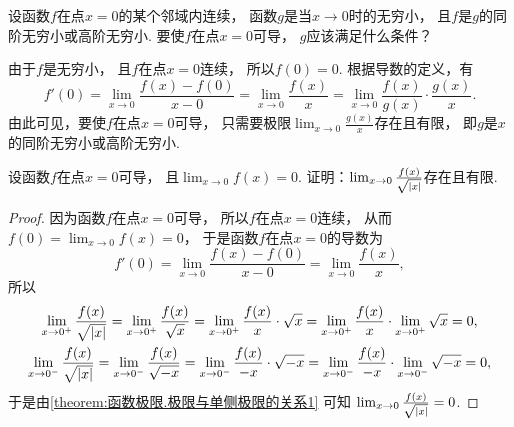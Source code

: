 \begin{example}
设函数\(f\)在点\(x=0\)的某个邻域内连续，
函数\(g\)是当\(x\to0\)时的无穷小，
且\(f\)是\(g\)的同阶无穷小或高阶无穷小.
要使\(f\)在点\(x=0\)可导，
\(g\)应该满足什么条件？
\begin{solution}
由于\(f\)是无穷小，
且\(f\)在点\(x=0\)连续，
所以\(f(0) = 0\).
根据导数的定义，有\[
	f'(0)
	= \lim_{x\to0} \frac{f(x) - f(0)}{x-0} %
	= \lim_{x\to0} \frac{f(x)}{x} %
	= \lim_{x\to0} \frac{f(x)}{g(x)} \cdot \frac{g(x)}{x}. %
\]
由此可见，要使\(f\)在点\(x=0\)可导，
只需要极限\(\lim_{x\to0} \frac{g(x)}{x}\)存在且有限，
即\(g\)是\(x\)的同阶无穷小或高阶无穷小.
\end{solution}
\end{example}
\begin{example}
设函数\(f\)在点\(x=0\)可导，
且\(\lim_{x\to0} f(x) = 0\).
证明：\(\lim_{x\to0} \frac{f(x)}{\sqrt{\abs{x}}}\)存在且有限.
\begin{proof}
因为函数\(f\)在点\(x=0\)可导，
所以\(f\)在点\(x=0\)连续，
从而\(f(0) = \lim_{x\to0} f(x) = 0\)，
于是函数\(f\)在点\(x=0\)的导数为\begin{equation*}
	f'(0)
	= \lim_{x\to0} \frac{f(x) - f(0)}{x - 0}
	= \lim_{x\to0} \frac{f(x)}{x},
\end{equation*}
所以\begin{gather*}
	\lim_{x\to0^+} \frac{f(x)}{\sqrt{\abs{x}}}
	= \lim_{x\to0^+} \frac{f(x)}{\sqrt{x}}
	= \lim_{x\to0^+} \frac{f(x)}{x} \cdot \sqrt{x}
	= \lim_{x\to0^+} \frac{f(x)}{x} \cdot \lim_{x\to0^+} \sqrt{x}
	= 0, \\
	\lim_{x\to0^-} \frac{f(x)}{\sqrt{\abs{x}}}
	= \lim_{x\to0^-} \frac{f(x)}{\sqrt{-x}}
	= \lim_{x\to0^-} \frac{f(x)}{-x} \cdot \sqrt{-x}
	= \lim_{x\to0^-} \frac{f(x)}{-x} \cdot \lim_{x\to0^-} \sqrt{-x}
	= 0,
\end{gather*}
于是由\cref{theorem:函数极限.极限与单侧极限的关系1} 可知
\(\lim_{x\to0} \frac{f(x)}{\sqrt{\abs{x}}} = 0\).
\end{proof}
\end{example}

